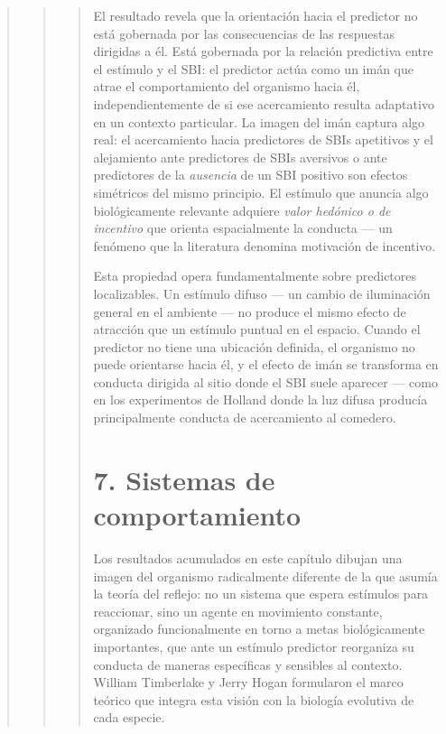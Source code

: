 \documentclass[
  letterpaper,
  DIV=11,
  numbers=noendperiod]{scrreprt}
\begin{document}
\begin{tcolorbox}[enhanced jigsaw, toprule=.15mm, arc=.35mm, colback=white, opacityback=0, colframe=quarto-callout-note-color-frame, breakable, rightrule=.15mm, left=2mm, leftrule=.75mm, bottomrule=.15mm]
\begin{quote}
\begin{quote}
\begin{quote}
El resultado revela que la orientación hacia el predictor no está
gobernada por las consecuencias de las respuestas dirigidas a él. Está
gobernada por la relación predictiva entre el estímulo y el SBI: el
predictor actúa como un imán que atrae el comportamiento del organismo
hacia él, independientemente de si ese acercamiento resulta adaptativo
en un contexto particular. La imagen del imán captura algo real: el
acercamiento hacia predictores de SBIs apetitivos y el alejamiento ante
predictores de SBIs aversivos o ante predictores de la \emph{ausencia}
de un SBI positivo son efectos simétricos del mismo principio. El
estímulo que anuncia algo biológicamente relevante adquiere \emph{valor
hedónico o de incentivo} que orienta espacialmente la conducta --- un
fenómeno que la literatura denomina motivación de incentivo.

Esta propiedad opera fundamentalmente sobre predictores localizables. Un
estímulo difuso --- un cambio de iluminación general en el ambiente ---
no produce el mismo efecto de atracción que un estímulo puntual en el
espacio. Cuando el predictor no tiene una ubicación definida, el
organismo no puede orientarse hacia él, y el efecto de imán se
transforma en conducta dirigida al sitio donde el SBI suele aparecer ---
como en los experimentos de Holland donde la luz difusa producía
principalmente conducta de acercamiento al comedero.

\section{7. Sistemas de
comportamiento}\label{sistemas-de-comportamiento}

Los resultados acumulados en este capítulo dibujan una imagen del
organismo radicalmente diferente de la que asumía la teoría del reflejo:
no un sistema que espera estímulos para reaccionar, sino un agente en
movimiento constante, organizado funcionalmente en torno a metas
biológicamente importantes, que ante un estímulo predictor reorganiza su
conducta de maneras específicas y sensibles al contexto. William
Timberlake y Jerry Hogan formularon el marco teórico que integra esta
visión con la biología evolutiva de cada especie.


\end{quote}
\end{quote}
\end{quote}
\end{tcolorbox}
\end{document}
